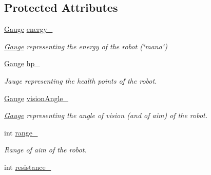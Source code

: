 \subsection*{Protected Attributes}
\begin{DoxyCompactItemize}
\item 
\hyperlink{class_gauge}{Gauge} \hyperlink{class_stats_a2cfce6b5e99bb508a961d79efc8aa1a1}{energy\+\_\+}\hypertarget{class_stats_a2cfce6b5e99bb508a961d79efc8aa1a1}{}\label{class_stats_a2cfce6b5e99bb508a961d79efc8aa1a1}

\begin{DoxyCompactList}\small\item\em \hyperlink{class_gauge}{Gauge} representing the energy of the robot (\char`\"{}mana\char`\"{}) \end{DoxyCompactList}\item 
\hyperlink{class_gauge}{Gauge} \hyperlink{class_stats_a794080cca1ba3fd839bd8cde0b1037d4}{hp\+\_\+}\hypertarget{class_stats_a794080cca1ba3fd839bd8cde0b1037d4}{}\label{class_stats_a794080cca1ba3fd839bd8cde0b1037d4}

\begin{DoxyCompactList}\small\item\em Jauge representing the health points of the robot. \end{DoxyCompactList}\item 
\hyperlink{class_gauge}{Gauge} \hyperlink{class_stats_ad33ec390d5ee19e939bbf94a7a4684d8}{vision\+Angle\+\_\+}\hypertarget{class_stats_ad33ec390d5ee19e939bbf94a7a4684d8}{}\label{class_stats_ad33ec390d5ee19e939bbf94a7a4684d8}

\begin{DoxyCompactList}\small\item\em \hyperlink{class_gauge}{Gauge} representing the angle of vision (and of aim) of the robot. \end{DoxyCompactList}\item 
int \hyperlink{class_stats_a7c0c99b80aff3250cdbc07f6a3e80bf3}{range\+\_\+}\hypertarget{class_stats_a7c0c99b80aff3250cdbc07f6a3e80bf3}{}\label{class_stats_a7c0c99b80aff3250cdbc07f6a3e80bf3}

\begin{DoxyCompactList}\small\item\em Range of aim of the robot. \end{DoxyCompactList}\item 
int \hyperlink{class_stats_aa07d405f82987200736a2d5bcfccf19d}{resistance\+\_\+}\hypertarget{class_stats_aa07d405f82987200736a2d5bcfccf19d}{}\label{class_stats_aa07d405f82987200736a2d5bcfccf19d}


\end{DoxyCompactItemize}
